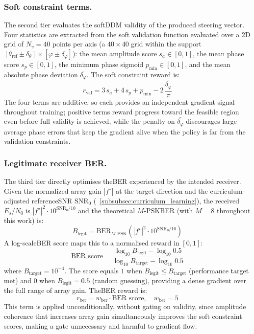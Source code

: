 \subsubsection{Soft constraint terms.}
The second tier evaluates the soft\gls{DDM} validity of the produced steering vector. Four statistics are extracted from the soft validation function evaluated over a 2D grid of $N_v = 40$ points per axis (a $40 \times 40$ grid within the support $[\theta_{\mathrm{ref}} \pm \delta_\theta] \times [\varphi \pm \delta_\varphi]$): the mean amplitude score $s_a \in [0,1]$, the mean phase score $s_p \in [0,1]$, the minimum phase sigmoid $p_{\min} \in [0,1]$, and the mean absolute phase deviation $\bar{\delta_\varphi}$. The soft constraint reward is:
\begin{equation}
    r_{\text{val}} = 3\,s_a + 4\,s_p + p_{\min} - 2\,\frac{\bar{\delta_\varphi}}{\pi}
\end{equation}
The four terms are additive, so each provides an independent gradient signal throughout training; positive terms reward progress toward the feasible region even before full validity is achieved, while the penalty on $\bar{\delta_\varphi}$ discourages large average phase errors that keep the gradient alive when the policy is far from the validation constraints.

\subsubsection{Legitimate receiver BER.}
The third tier directly optimises the\gls{BER} experienced by the intended receiver. Given the normalized array gain $|f^\star|$ at the target direction and the curriculum-adjusted reference\gls{SNR} $\mathrm{SNR}_0$ (\subsubsectionname~\ref{subsubsec:curriculum_learning}), the received $E_s/N_0$ is $|f^\star|^2 \cdot 10^{\mathrm{SNR}_0/10}$ and the theoretical $M$-\gls{PSK}\gls{BER} (with $M = 8$ throughout this work) is:
\begin{equation}
    B_{\text{legit}} = \mathrm{BER}_{M\text{-PSK}}\!\left(|f^\star|^2 \cdot 10^{\mathrm{SNR}_0/10}\right)
\end{equation}
A log-scale\gls{BER} score maps this to a normalised reward in $[0, 1]$:
\begin{equation}
    \mathrm{BER\_score} = \frac{\log_{10} B_{\text{legit}} - \log_{10} 0.5}{\log_{10} B_{\text{target}} - \log_{10} 0.5}
\end{equation}
where $B_{\text{target}} = 10^{-4}$. The score equals $1$ when $B_{\text{legit}} \leq B_{\text{target}}$ (performance target met) and $0$ when $B_{\text{legit}} = 0.5$ (random guessing), providing a dense gradient over the full range of array gain. The\gls{BER} reward is:
\begin{equation}
    r_{\text{ber}} = w_{\text{ber}} \cdot \mathrm{BER\_score}, \quad w_{\text{ber}} = 5
\end{equation}
This term is applied unconditionally, without gating on validity, since amplitude coherence that increases array gain simultaneously improves the soft constraint scores, making a gate unnecessary and harmful to gradient flow.

